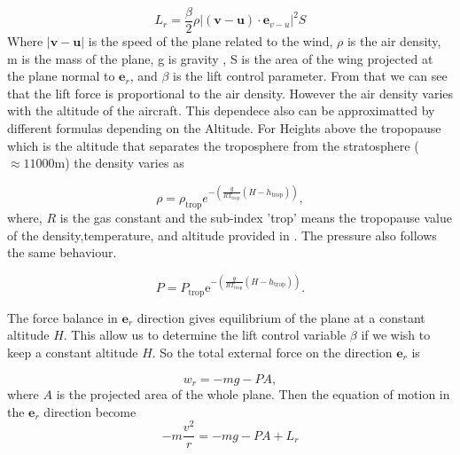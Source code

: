 \documentclass{article}
\renewcommand{\vec}[1]{\boldsymbol{#1}}
\begin{document}
\begin{equation}
    L_r= \frac{\beta }{2} \rho |(\vec{v}-\vec{u})\cdot \vec e_{v-u}|^2S
\end{equation}
Where $|\vec{v}-\vec{u}|$ is the speed of the plane related to the wind, $\rho$ is the air density, m is the mass of the plane, g is gravity , S is the area of the wing  projected at the plane normal to $\vec{e}_r$, and $\beta$ is the lift control parameter. From that we can see that the lift force is proportional to the air density. However the air density varies with the altitude of the aircraft. This dependece also can be approximatted by different formulas depending on the Altitude. For Heights above the tropopause  \cite{nuic2004bada} which is the altitude that separates the troposphere from the stratosphere ($\approx 11000$m) the density varies as

\begin{equation}
    \rho= \rho_{\text{trop}}e^{-\left( \frac{g}{RT_{\text{trop}}}(H-h_{\text{trop}}) \right)},
\end{equation}
where, $R$ is the gas constant  and the sub-index 'trop' means the tropopause value of the density,temperature, and altitude provided in \cite{nuic2004bada}. The pressure also follows the same behaviour.

\begin{equation}
    P= P_{\text{trop}}\mathrm{e}^{-\left( \frac{g}{RT_{\text{trop}}}(H-h_{\text{trop}}) \right)}.
\end{equation}
 

The force balance in $\vec{e}_r$ direction gives equilibrium of the plane at a constant altitude $H$. This allow us to determine the lift control variable $\beta$ if we wish to keep a constant altitude $H$. So the total external force on the direction $\vec{e}_r$ is 

\begin{equation}
    w_r=-mg -PA ,
\end{equation}
where $A$ is the projected area of the whole plane. Then the equation of motion in the $\vec{e}_r$ direction become
\begin{equation}
    -m\frac{v^2}{r}=-mg- PA +L_r
\end{equation}
\end{document}
